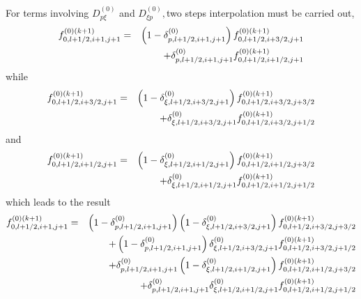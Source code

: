 For terms involving $D_{p\xi }^{\left( 0\right) }$ and $D_{\xi p}^{\left(
0\right) },$two steps interpolation must be carried out, 
\begin{eqnarray}
f_{0,l+1/2,i+1,j+1}^{\left( 0\right) (k+1)} &=&\left( 1-\delta
_{p,l+1/2,i+1,j+1}^{\left( 0\right) }\right) f_{0,l+1/2,i+3/2,j+1}^{\left(
0\right) (k+1)}  \notag \\
&&+\delta _{p,l+1/2,i+1,j+1}^{\left( 0\right) }f_{0,l+1/2,i+1/2,j+1}^{\left(
0\right) (k+1)}
\end{eqnarray}%
while 
\begin{eqnarray}
f_{0,l+1/2,i+3/2,j+1}^{\left( 0\right) (k+1)} &=&\left( 1-\delta _{\xi
,l+1/2,i+3/2,j+1}^{\left( 0\right) }\right) f_{0,l+1/2,i+3/2,j+3/2}^{\left(
0\right) (k+1)}  \notag \\
&&+\delta _{\xi ,l+1/2,i+3/2,j+1}^{\left( 0\right)
}f_{0,l+1/2,i+3/2,j+1/2}^{\left( 0\right) (k+1)}
\end{eqnarray}%
and 
\begin{eqnarray}
f_{0,l+1/2,i+1/2,j+1}^{\left( 0\right) (k+1)} &=&\left( 1-\delta _{\xi
,l+1/2,i+1/2,j+1}^{\left( 0\right) }\right) f_{0,l+1/2,i+1/2,j+3/2}^{\left(
0\right) (k+1)}  \notag \\
&&+\delta _{\xi ,l+1/2,i+1/2,j+1}^{\left( 0\right)
}f_{0,l+1/2,i+1/2,j+1/2}^{\left( 0\right) (k+1)}
\end{eqnarray}%
which leads to the result 
\begin{eqnarray}
f_{0,l+1/2,i+1,j+1}^{\left( 0\right) (k+1)} &=&\left( 1-\delta
_{p,l+1/2,i+1,j+1}^{\left( 0\right) }\right) \left( 1-\delta _{\xi
,l+1/2,i+3/2,j+1}^{\left( 0\right) }\right) f_{0,l+1/2,i+3/2,j+3/2}^{\left(
0\right) (k+1)}  \notag \\
&&+\left( 1-\delta _{p,l+1/2,i+1,j+1}^{\left( 0\right) }\right) \delta _{\xi
,l+1/2,i+3/2,j+1}^{\left( 0\right) }f_{0,l+1/2,i+3/2,j+1/2}^{\left( 0\right)
(k+1)}  \notag \\
&&+\delta _{p,l+1/2,i+1,j+1}^{\left( 0\right) }\left( 1-\delta _{\xi
,l+1/2,i+1/2,j+1}^{\left( 0\right) }\right) f_{0,l+1/2,i+1/2,j+3/2}^{\left(
0\right) (k+1)}  \notag \\
&&+\delta _{p,l+1/2,i+1,j+1}^{\left( 0\right) }\delta _{\xi
,l+1/2,i+1/2,j+1}^{\left( 0\right) }f_{0,l+1/2,i+1/2,j+1/2}^{\left( 0\right)
(k+1)}
\end{eqnarray}

